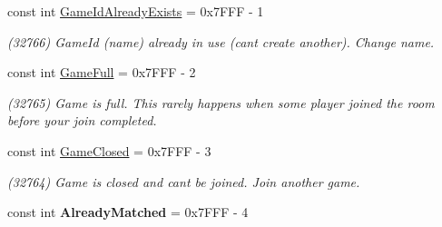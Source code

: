 \begin{DoxyCompactItemize}
const int \hyperlink{class_exit_games_1_1_client_1_1_photon_1_1_error_code_a2898552672360480d562a6f9958790d9}{Game\+Id\+Already\+Exists} = 0x7\+F\+F\+F -\/ 1
\begin{DoxyCompactList}\small\item\em (32766) Game\+Id (name) already in use (can\textquotesingle{}t create another). Change name.\end{DoxyCompactList}\item 
const int \hyperlink{class_exit_games_1_1_client_1_1_photon_1_1_error_code_ae558d99e91f22c6e7c54a6b07f299a8a}{Game\+Full} = 0x7\+F\+F\+F -\/ 2
\begin{DoxyCompactList}\small\item\em (32765) Game is full. This rarely happens when some player joined the room before your join completed.\end{DoxyCompactList}\item 
const int \hyperlink{class_exit_games_1_1_client_1_1_photon_1_1_error_code_ae684a99ed82da84e00412c0e24c37dd7}{Game\+Closed} = 0x7\+F\+F\+F -\/ 3
\begin{DoxyCompactList}\small\item\em (32764) Game is closed and can\textquotesingle{}t be joined. Join another game.\end{DoxyCompactList}\item 
const int {\bfseries Already\+Matched} = 0x7\+F\+F\+F -\/ 4\hypertarget{class_exit_games_1_1_client_1_1_photon_1_1_error_code_a434e3c23f618eaad22e1ef1b99c47042}{}\label{class_exit_games_1_1_client_1_1_photon_1_1_error_code_a434e3c23f618eaad22e1ef1b99c47042}


\end{DoxyCompactItemize}
